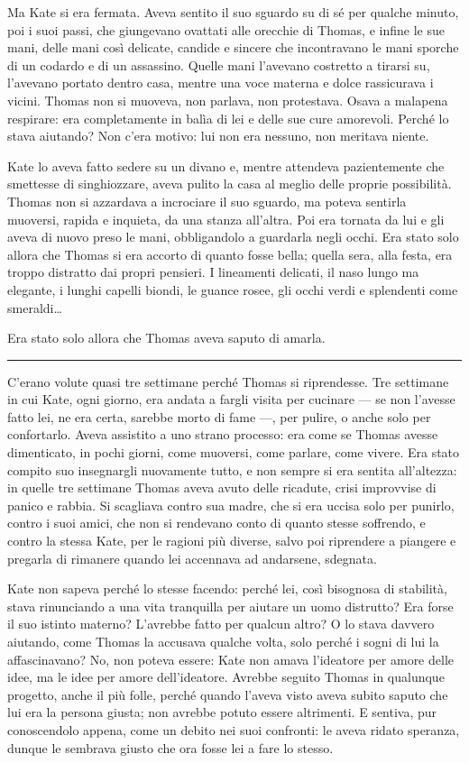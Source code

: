 \documentclass[a4paper,oneside,9pt]{memoir}
\begin{document}
Ma Kate si era fermata. Aveva sentito il suo sguardo su di sé per qualche minuto, poi i suoi passi, che giungevano
ovattati alle orecchie di Thomas, e infine le sue mani, delle mani così delicate, candide e sincere che incontravano
le mani sporche di un codardo e di un assassino. Quelle mani l'avevano costretto a tirarsi su, l'avevano portato dentro
casa, mentre una voce materna e dolce rassicurava i vicini. Thomas non si muoveva, non parlava, non protestava. Osava a
malapena respirare: era completamente in balìa di lei e delle sue cure amorevoli. Perché lo stava aiutando? Non c'era
motivo: lui non era nessuno, non meritava niente.

Kate lo aveva fatto sedere su un divano e, mentre attendeva pazientemente che smettesse di singhiozzare, aveva pulito la
casa al meglio delle proprie possibilità. Thomas non si azzardava a incrociare il suo sguardo, ma poteva sentirla
muoversi, rapida e inquieta, da una stanza all'altra. Poi era tornata da lui e gli aveva di nuovo preso le mani,
obbligandolo a guardarla negli occhi. Era stato solo allora che Thomas si era accorto di quanto fosse bella; quella
sera, alla festa, era troppo distratto dai propri pensieri. I lineamenti delicati, il naso lungo ma elegante, i lunghi
capelli biondi, le guance rosee, gli occhi verdi e splendenti come smeraldi\dots{}

Era stato solo allora che Thomas aveva saputo di amarla.

\plainbreak{1}

C'erano volute quasi tre settimane perché Thomas si riprendesse. Tre settimane in cui Kate, ogni giorno, era andata a
fargli visita per cucinare --- se non l'avesse fatto lei, ne era certa, sarebbe morto di fame ---, per pulire, o anche
solo per confortarlo. Aveva assistito a uno strano processo: era come se Thomas avesse dimenticato, in pochi giorni,
come muoversi, come parlare, come vivere. Era stato compito suo insegnargli nuovamente tutto, e non sempre si era
sentita all'altezza: in quelle tre settimane Thomas aveva avuto delle ricadute, crisi improvvise di panico e rabbia. Si
scagliava contro sua madre, che si era uccisa solo per punirlo, contro i suoi amici, che non si rendevano conto di
quanto stesse soffrendo, e contro la stessa Kate, per le ragioni più diverse, salvo poi riprendere a piangere e pregarla
di rimanere quando lei accennava ad andarsene, sdegnata.

Kate non sapeva perché lo stesse facendo: perché lei, così bisognosa di stabilità, stava rinunciando a una vita
tranquilla per aiutare un uomo distrutto? Era forse il suo istinto materno? L'avrebbe fatto per qualcun altro? O lo
stava davvero aiutando, come Thomas la accusava qualche volta, solo perché i sogni di lui la affascinavano? No, non
poteva essere: Kate non amava l'ideatore per amore delle idee, ma le idee per amore dell'ideatore. Avrebbe seguito
Thomas in qualunque progetto, anche il più folle, perché quando l'aveva visto aveva subito saputo che lui era la persona
giusta; non avrebbe potuto essere altrimenti. E sentiva, pur conoscendolo appena, come un debito nei suoi confronti: le
aveva ridato speranza, dunque le sembrava giusto che ora fosse lei a fare lo stesso.
\end{document}
